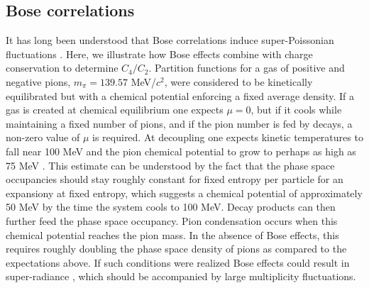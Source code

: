 \subsection{Bose correlations}\label{sec:bose_uniform}

It has long been understood that Bose correlations induce super-Poissonian fluctuations \cite{Carruthers:1983my,Carruthers:1989jj}. Here, we illustrate how Bose effects combine with charge conservation to determine $C_4/C_2$. Partition functions for a gas of positive and negative pions, $m_\pi=139.57$ MeV/$c^2$, were considered to be kinetically equilibrated but with a chemical potential enforcing a fixed average density. If a gas is created at chemical equilibrium one expects $\mu=0$, but if it cools while maintaining a fixed number of pions, and if the pion number is fed by decays, a non-zero value of $\mu$ is required. At decoupling one expects kinetic temperatures to fall near 100 MeV and the pion chemical potential to grow to perhaps as high as 75 MeV \cite{Greiner:1993jn}. This estimate can be understood by the fact that the phase space occupancies should stay roughly constant for fixed entropy per particle for an expansiony at fixed entropy, which suggests a chemical potential of approximately 50 MeV by the time the system cools to 100 MeV. Decay products can then further feed the phase space occupancy. Pion condensation occurs when this chemical potential reaches the pion mass. In the absence of Bose effects, this requires roughly doubling the phase space density of pions as compared to the expectations above. If such conditions were realized Bose effects could result in super-radiance \cite{Pratt:1993uy}, which should be accompanied by large multiplicity fluctuations. 


